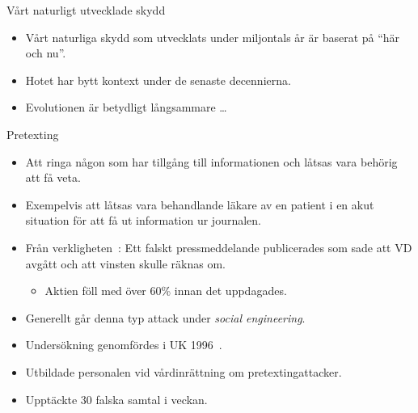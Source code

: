 \documentclass{beamer}
\begin{document}
\begin{frame}{\insertsubsectionhead}{Vårt naturligt utvecklade skydd}
  \begin{itemize}
    \item Vårt naturliga skydd som utvecklats under miljontals år är baserat på 
      \enquote{här och nu}.

    \item Hotet har bytt kontext under de senaste decennierna.

    \item Evolutionen är betydligt långsammare \dots

  \end{itemize}
\end{frame}

\begin{frame}{\insertsubsectionhead}{Pretexting}
  \begin{itemize}
    \item Att ringa någon som har tillgång till informationen och låtsas vara 
      behörig att få veta.

    \item Exempelvis att låtsas vara behandlande läkare av en patient i en akut 
      situation för att få ut information ur journalen.

    \item Från verkligheten~\cite{Anderson2008sea}: Ett falskt pressmeddelande 
      publicerades som sade att VD avgått och att vinsten skulle räknas om.
      \begin{itemize}
        \item Aktien föll med över \unit{60}{\%} innan det uppdagades.
      \end{itemize}

    \item Generellt går denna typ attack under \emph{social engineering}.

  \end{itemize}
\end{frame}

\begin{frame}{\insertsubsectionhead}
  \begin{itemize}
    \item Undersökning genomfördes i UK 1996~\cite{Anderson2008sea}.
    \item Utbildade personalen vid vårdinrättning om pretextingattacker.
    \item Upptäckte 30 falska samtal i veckan.
  \end{itemize}
\end{frame}
\end{document}
